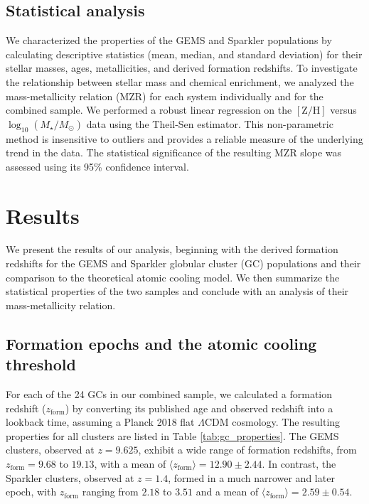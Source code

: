 \documentclass[]{article}
\begin{document}
\subsection{Statistical analysis}
We characterized the properties of the GEMS and Sparkler populations by calculating descriptive statistics (mean, median, and standard deviation) for their stellar masses, ages, metallicities, and derived formation redshifts. To investigate the relationship between stellar mass and chemical enrichment, we analyzed the mass-metallicity relation (MZR) for each system individually and for the combined sample. We performed a robust linear regression on the $[\mathrm{Z/H}]$ versus $\log_{10}(M_\star/M_\odot)$ data using the Theil-Sen estimator. This non-parametric method is insensitive to outliers and provides a reliable measure of the underlying trend in the data. The statistical significance of the resulting MZR slope was assessed using its 95\% confidence interval.

\section{Results}
\label{sec:results}
We present the results of our analysis, beginning with the derived formation redshifts for the GEMS and Sparkler globular cluster (GC) populations and their comparison to the theoretical atomic cooling model. We then summarize the statistical properties of the two samples and conclude with an analysis of their mass-metallicity relation.

\subsection{Formation epochs and the atomic cooling threshold}

For each of the 24 GCs in our combined sample, we calculated a formation redshift ($z_\mathrm{form}$) by converting its published age and observed redshift into a lookback time, assuming a Planck 2018 flat $\Lambda$CDM cosmology. The resulting properties for all clusters are listed in Table \ref{tab:gc_properties}. The GEMS clusters, observed at $z=9.625$, exhibit a wide range of formation redshifts, from $z_\mathrm{form} = 9.68$ to $19.13$, with a mean of $\langle z_\mathrm{form} \rangle = 12.90 \pm 2.44$. In contrast, the Sparkler clusters, observed at $z=1.4$, formed in a much narrower and later epoch, with $z_\mathrm{form}$ ranging from $2.18$ to $3.51$ and a mean of $\langle z_\mathrm{form} \rangle = 2.59 \pm 0.54$.
\end{document}

